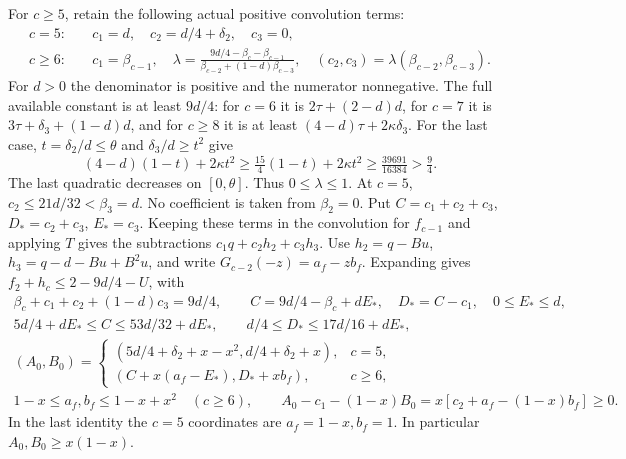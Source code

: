 For \(c\ge5\), retain the following actual positive convolution terms:
\begin{equation}\label{eq:outer-unit:retention}
\begin{aligned}
 c=5:&\quad c_1=d,\quad c_2=d/4+\delta_2,\quad c_3=0,\\
 c\ge6:&\quad c_1=\beta_{c-1},\quad
 \lambda=\frac{9d/4-\beta_c-\beta_{c-1}}
 {\beta_{c-2}+(1-d)\beta_{c-3}},\quad
 (c_2,c_3)=\lambda(\beta_{c-2},\beta_{c-3}).
\end{aligned}
\end{equation}
For \(d>0\) the denominator is positive and the numerator nonnegative.
The full available constant is at least \(9d/4\): for \(c=6\) it is
\(2\tau+(2-d)d\), for \(c=7\) it is
\(3\tau+\delta_3+(1-d)d\), and for \(c\ge8\) it is at least
\((4-d)\tau+2\kappa\delta_3\).
For the last case, \(t=\delta_2/d\le\theta\) and
\(\delta_3/d\ge t^2\) give
\[
 (4-d)(1-t)+2\kappa t^2
 \ge\tfrac{15}{4}(1-t)+2\kappa t^2
 \ge\tfrac{39691}{16384}>\tfrac94.
\]
The last quadratic decreases on \([0,\theta]\).
Thus \(0\le\lambda\le1\). At \(c=5\),
\(c_2\le21d/32<\beta_3=d\). No coefficient is taken from \(\beta_2=0\).
Put \(C=c_1+c_2+c_3\), \(D_*=c_2+c_3\), \(E_*=c_3\).
Keeping these terms in the convolution for \(f_{c-1}\) and applying
\(T\) gives the subtractions \(c_1q+c_2h_2+c_3h_3\).
Use \(h_2=q-Bu\), \(h_3=q-d-Bu+B^2u\), and write
\(G_{c-2}(-z)=a_f-zb_f\). Expanding gives
\(f_2+h_c\le2-9d/4-U\), with
\begin{equation}\label{eq:outer-unit:retained-data}
\begin{gathered}
 \beta_c+c_1+c_2+(1-d)c_3=9d/4,\qquad
 C=9d/4-\beta_c+dE_*,\quad D_*=C-c_1,\quad0\le E_*\le d,\\
 5d/4+dE_*\le C\le53d/32+dE_*,\qquad
 d/4\le D_*\le17d/16+dE_*,\\
 (A_0,B_0)=
 \begin{cases}(5d/4+\delta_2+x-x^2, d/4+\delta_2+x),&c=5,\\
 (C+x(a_f-E_*), D_*+xb_f),&c\ge6,
 \end{cases}\\
 1-x\le a_f,b_f\le1-x+x^2\quad(c\ge6),\qquad
 A_0-c_1-(1-x)B_0=x[c_2+a_f-(1-x)b_f]\ge0.
\end{gathered}
\end{equation}
In the last identity the \(c=5\) coordinates are \(a_f=1-x,b_f=1\).
In particular \(A_0,B_0\ge x(1-x)\).

